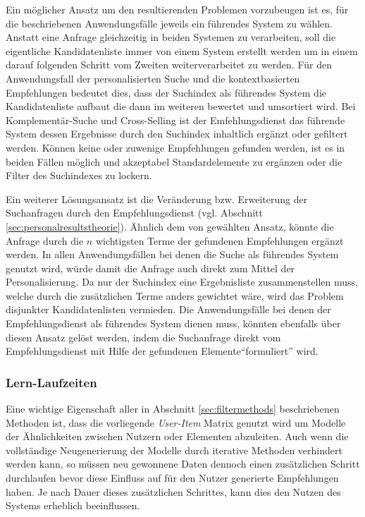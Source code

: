 Ein möglicher Ansatz um den resultierenden Problemen vorzubeugen ist es, für die beschriebenen Anwendungsfälle jeweils ein führendes System zu wählen. Anstatt eine Anfrage gleichzeitig in beiden Systemen zu verarbeiten, soll die eigentliche Kandidatenliste immer von einem System erstellt werden um in einem darauf folgenden Schritt vom Zweiten weiterverarbeitet zu werden. Für den Anwendungsfall der personalisierten Suche und die kontextbasierten Empfehlungen bedeutet dies, dass der Suchindex als führendes System die Kandidatenliste aufbaut die dann im weiteren bewertet und umsortiert wird. Bei Komplementär-Suche und Cross-Selling ist der Emfehlungsdienst das führende System dessen Ergebnisse durch den Suchindex inhaltlich ergänzt oder gefiltert werden. Können keine oder zuwenige Empfehlungen gefunden werden, ist es in beiden Fällen möglich und akzeptabel Standardelemente zu ergänzen oder die Filter des Suchindexes zu lockern.

Ein weiterer Lösungsansatz ist die Veränderung bzw. Erweiterung der Suchanfragen durch den Empfehlungsdienst (vgl. Abschnitt \ref{sec:personalresultstheorie}). Ähnlich dem von \citep{Boughareb11} gewählten Ansatz, könnte die Anfrage durch die  $n$ wichtigsten Terme der gefundenen Empfehlungen ergänzt werden. In allen Anwendungsfällen bei denen die Suche als führendes System genutzt wird, würde damit die Anfrage auch direkt zum Mittel der Personalisierung. Da nur der Suchindex eine Ergebnisliste zusammenstellen muss, welche durch die zusätzlichen Terme anders gewichtet wäre, wird das Problem disjunkter Kandidatenlisten vermieden. Die Anwendungsfälle bei denen der Empfehlungsdienst als führendes System dienen muss, könnten ebenfalls über diesen Ansatz gelöst werden, indem die Suchanfrage direkt vom Empfehlungsdienst mit Hilfe der gefundenen Elemente``formuliert'' wird.  


\subsubsection{Lern-Laufzeiten}

Eine wichtige Eigenschaft aller in Abschnitt \ref{sec:filtermethods} beschriebenen Methoden ist, dass die vorliegende \textit{User-Item} Matrix genutzt wird um Modelle der Ähnlichkeiten zwischen Nutzern oder Elementen abzuleiten.  Auch wenn die vollständige Neugenerierung der Modelle durch iterative Methoden verhindert werden kann, so müssen neu gewonnene Daten dennoch einen zusätzlichen Schritt durchlaufen bevor diese Einfluss auf für den Nutzer generierte Empfehlungen haben. Je nach Dauer dieses zusätzlichen Schrittes, kann dies den Nutzen des Systems erheblich beeinflussen.

